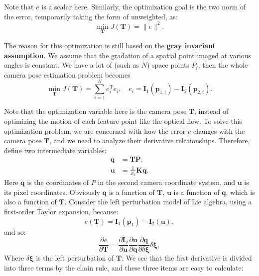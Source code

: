 Note that $e$ is a scalar here. Similarly, the optimization goal is the two norm of the error, temporarily taking the form of unweighted, as:
\begin{equation}
\mathop {\min }\limits_{\bm{T}} J\left( \bm{T} \right) = \|e\|^2.
\end{equation}

The reason for this optimization is still based on the \textbf{gray invariant assumption}. We assume that the gradation of a spatial point imaged at various angles is constant. We have a lot of (such as $N$) space points $P_i$, then the whole camera pose estimation problem becomes
\begin{equation}
\mathop {\min }\limits_{\bm{T}} J\left( \bm{T} \right) = \sum\limits_{i = 1}^N {e_i^\mathrm{T}{e_i} }, \quad {e_i} = {\bm{I}_1}\left( {{\bm{p}_{1,i}}} \right) - {\bm{I}_2}\left( { { \bm{p}_{2,i}}} \right).
\end{equation}

Note that the optimization variable here is the camera pose $\bm{T}$, instead of optimizing the motion of each feature point like the optical flow. To solve this optimization problem, we are concerned with how the error $e$ changes with the camera pose $\bm{T}$, and we need to analyze their derivative relationships. Therefore, define two intermediate variables:
\begin{align*}
\bm{q} &= \bm{T} \bm{P}, \\
\bm{u} &= \frac{1}{{{Z_2}}} \bm{K} \bm{q}.
\end{align*}
Here $\bm{q}$ is the coordinates of $P$ in the second camera coordinate system, and $\bm{u}$ is its pixel coordinates. Obviously $\bm{q}$ is a function of $\bm{T}$, $\bm{u}$ is a function of $\bm{q}$, which is also a function of $\bm{T}$. Consider the left perturbation model of Lie algebra, using a first-order Taylor expansion, because:
\begin{equation}
e(\bm{T})=\bm{I}_1(\bm{p}_{1})-\bm{I}_2(\bm{u}),
\end{equation}
and so:
\begin{equation}
\frac{\partial e}{\partial \bm{T}} = \frac{{\partial {\bm{I}_2}}}{{\partial \bm{u}}}\frac{{\partial \bm{u}}}{{\partial \bm{q}}}\frac{{\partial \bm{q}}}{{\partial \delta \bm{\xi} }}\delta \bm{ \xi},
\end{equation}
Where $\delta \bm{\xi}$ is the left perturbation of $\bm{T}$. We see that the first derivative is divided into three terms by the chain rule, and these three items are easy to calculate:

